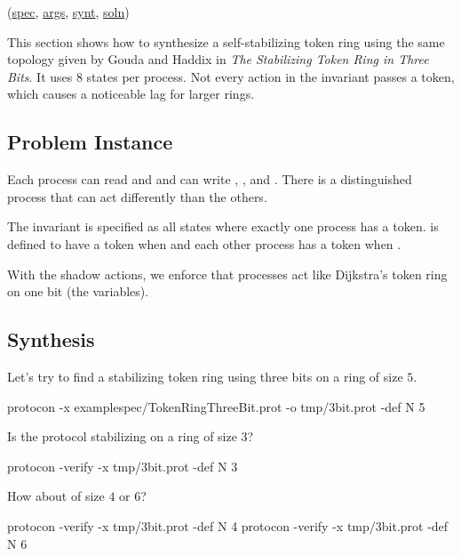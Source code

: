 (\href{\examplespec/TokenRingThreeBit.prot}{spec},
\href{\examplesett/TokenRingThreeBit.args}{args},
\href{\examplesynt/TokenRingThreeBit.prot}{synt},
\href{\examplesoln/TokenRingThreeBit.prot}{soln})

This section shows how to synthesize a self-stabilizing token ring using the same topology given by
Gouda and Haddix in \textit{The Stabilizing Token Ring in Three Bits}.
It uses 8 states per process.
Not every action in the invariant passes a token, which causes a noticeable lag for larger rings.

\subsection{Problem Instance}


Each process can read  and  and can write , , and .
There is a distinguished process  that can act differently than the others.

The invariant is specified as all states where exactly one process has a token.
 is defined to have a token when  and each other  process has a token when .

With the shadow actions, we enforce that processes act like Dijkstra's token ring on one bit (the  variables).

\subsection{Synthesis}

Let's try to find a stabilizing token ring using three bits on a ring of size $5$.
\begin{code}
protocon -x examplespec/TokenRingThreeBit.prot -o tmp/3bit.prot -def N 5
\end{code}

Is the protocol stabilizing on a ring of size $3$?
\begin{code}
protocon -verify -x tmp/3bit.prot -def N 3
\end{code}

How about of size $4$ or $6$?
\begin{code}
protocon -verify -x tmp/3bit.prot -def N 4
protocon -verify -x tmp/3bit.prot -def N 6
\end{code}

